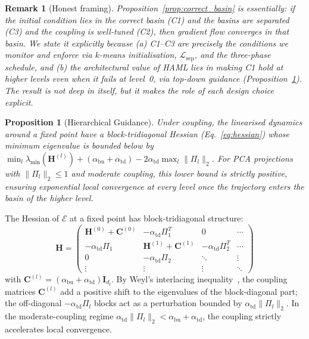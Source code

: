 \documentclass[11pt,a4paper]{article}
\newtheorem{proposition}[theorem]{Proposition}
\newtheorem{remark}[theorem]{Remark}
\begin{document}
\begin{remark}[Honest framing]
Proposition~\ref{prop:correct_basin} is essentially: \emph{if} the initial condition lies
in the correct basin (C1) \emph{and} the basins are separated (C3) \emph{and} the coupling
is well-tuned (C2), \emph{then} gradient flow converges in that basin. We state it
explicitly because (a) C1--C3 are precisely the conditions we monitor and enforce via
$k$-means initialisation, $\mathcal{L}_{\mathrm{sep}}$, and the three-phase schedule, and
(b) the architectural value of HAML lies in making C1 hold at \emph{higher} levels even
when it fails at level~0, via top-down guidance (Proposition~\ref{prop:guidance}). The
result is not deep in itself, but it makes the role of each design choice explicit.
\end{remark}

\begin{proposition}[Hierarchical Guidance]
\label{prop:guidance}
Under coupling, the linearised dynamics around a fixed point have a block-tridiagonal
Hessian (Eq.~\ref{eq:hessian}) whose minimum eigenvalue is bounded below by
$\min_l \lambda_{\min}(\mathbf{H}^{(l)}) + (\alpha_{\mathrm{bu}}+\alpha_{\mathrm{td}}) - 2\alpha_{\mathrm{td}}\max_l\|\Pi_l\|_2$.
For PCA projections with $\|\Pi_l\|_2 \le 1$ and moderate coupling, this lower bound is
strictly positive, ensuring exponential local convergence at every level once the
trajectory enters the basin of the higher level.
\end{proposition}

The Hessian of $\mathcal{E}$ at a fixed point has block-tridiagonal structure:
\begin{equation}
  \mathbf{H} = \begin{pmatrix}
    \mathbf{H}^{(0)} + \mathbf{C}^{(0)} & -\alpha_{\mathrm{td}}\Pi_1^T & 0 & \cdots \\
    -\alpha_{\mathrm{td}}\Pi_1 & \mathbf{H}^{(1)} + \mathbf{C}^{(1)} & -\alpha_{\mathrm{td}}\Pi_2^T & \cdots \\
    0 & -\alpha_{\mathrm{td}}\Pi_2 & \ddots & \vdots \\
    \vdots & \vdots & \vdots & \ddots
  \end{pmatrix}
\label{eq:hessian}
\end{equation}
with $\mathbf{C}^{(l)} = (\alpha_{\mathrm{bu}} + \alpha_{\mathrm{td}})\mathbf{I}_{d_l}$.
By Weyl's interlacing inequality~\cite{weyl1912}, the coupling matrices $\mathbf{C}^{(l)}$
add a positive shift to the eigenvalues of the block-diagonal part; the off-diagonal
$-\alpha_{\mathrm{td}}\Pi_l$ blocks act as a perturbation bounded by
$\alpha_{\mathrm{td}}\|\Pi_l\|_2$. In the moderate-coupling regime
$\alpha_{\mathrm{td}} \|\Pi_l\|_2 < \alpha_{\mathrm{bu}}+\alpha_{\mathrm{td}}$, the
coupling strictly accelerates local convergence.
\end{document}
